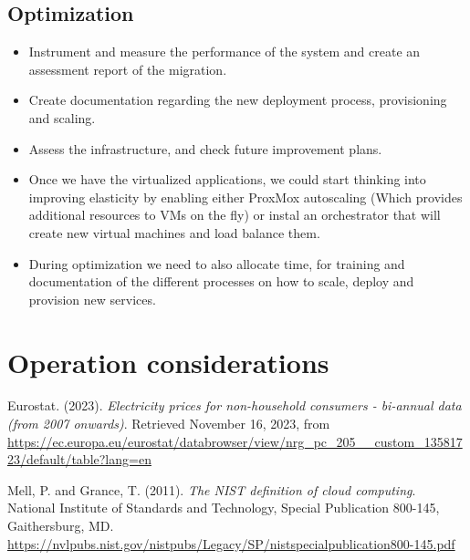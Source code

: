 \documentclass{llncs}
\begin{document}
\subsection{Optimization}

\begin{itemize}
  \item Instrument and measure the performance of the system and create an assessment report of the migration.
        
  \item Create documentation regarding the new deployment process, provisioning and scaling.
        
  \item Assess the infrastructure, and check future improvement plans.
        
  \item Once we have the virtualized applications, we could start thinking into improving elasticity by enabling either ProxMox autoscaling (Which provides additional resources to VMs on the fly) or instal an orchestrator that will create new virtual machines and load balance them.
        
  \item During optimization we need to also allocate time, for training and documentation of the different processes on how to scale, deploy and provision new services.
\end{itemize}

\section{Operation considerations}


\begin{thebibliography}{5}
  
Eurostat. (2023). \textit{Electricity prices for non-household consumers - bi-annual data (from 2007 onwards)}. Retrieved November 16, 2023, from \url{https://ec.europa.eu/eurostat/databrowser/view/nrg_pc_205__custom_13581723/default/table?lang=en}

Mell, P. and Grance, T. (2011).
\emph{The NIST definition of cloud computing}.
National Institute of Standards and Technology, Special Publication 800-145, Gaithersburg, MD.
\url{https://nvlpubs.nist.gov/nistpubs/Legacy/SP/nistspecialpublication800-145.pdf} 

\end{thebibliography}
\end{document}
